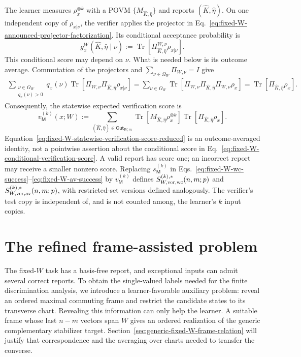 \documentclass[11pt]{article}
\newcommand{\Tr}{\operatorname{Tr}}
\newcommand{\1}{\mathbf 1}
\theoremstyle{plain}
\theoremstyle{definition}
\theoremstyle{remark}
\begin{document}
The learner measures $\rho_x^{\otimes k}$ with a POVM
$\{M_{\widehat K,\widehat\eta}\}$ and reports
$(\widehat K,\widehat\eta)$.  On one independent copy of
$\rho_{x|\nu}$, the verifier applies the projector in
Eq.~\eqref{eq:fixed-W-announced-projector-factorization}.  Its conditional
acceptance probability is
\begin{equation}
 g_x^W(\widehat K,\widehat\eta\mid\nu)
 :=\Tr[\Pi_{\widehat K,\widehat\eta}^{W,\nu}\rho_{x|\nu}].
 \label{eq:fixed-W-conditional-verification-score}
\end{equation}
This conditional score may depend on $\nu$.  What is needed below is its
outcome average.  Commutation of the projectors and
$\sum_{\nu\in\Omega_W}\Pi_{W,\nu}=I$ give
\begin{align}
 \sum_{\substack{\nu\in\Omega_W\\q_x(\nu)>0}}
 q_x(\nu)
 \Tr\!\left[
   \Pi_{W,\nu}\Pi_{\widehat K,\widehat\eta}
   \rho_{x|\nu}
 \right]
 =
 \sum_{\nu\in\Omega_W}
 \Tr\!\left[
   \Pi_{W,\nu}\Pi_{\widehat K,\widehat\eta}
   \Pi_{W,\nu}\rho_x
 \right]
 =\Tr[\Pi_{\widehat K,\widehat\eta}\rho_x].
 \label{eq:fixed-W-outcome-averaged-score}
\end{align}
Consequently, the statewise expected verification score is
\begin{equation}
 v_{\mathsf M}^{(k)}(x;W)
 :=\sum_{(\widehat K,\widehat\eta)\in\mathsf{Out}_{W,m}}
 \Tr[M_{\widehat K,\widehat\eta}\rho_x^{\otimes k}]
 \Tr[\Pi_{\widehat K,\widehat\eta}\rho_x].
 \label{eq:fixed-W-statewise-verification-score-reduced}
\end{equation}
Equation~\eqref{eq:fixed-W-statewise-verification-score-reduced} is an
outcome-averaged identity, not a pointwise assertion about the conditional
score in Eq.~\eqref{eq:fixed-W-conditional-verification-score}.  A valid report
has score one; an incorrect report may receive a smaller nonzero score.
Replacing $s_{\mathsf M}^{(k)}$ in
Eqs.~\eqref{eq:fixed-W-wc-success}--\eqref{eq:fixed-W-av-success} by
$v_{\mathsf M}^{(k)}$ defines
$S_{W,\rm ver,wc}^{(k),*}(n,m;p)$ and
$S_{W,\rm ver,av}^{(k),*}(n,m;p)$, with restricted-set versions defined
analogously.  The verifier's test copy is independent of, and is not counted
among, the learner's $k$ input copies.

\section{The refined frame-assisted problem}
\label{sec:model-main-results}
The fixed-$W$ task has a basis-free report, and exceptional inputs can admit
several correct reports.  To obtain the single-valued labels needed for the
finite discrimination analysis, we introduce a learner-favorable auxiliary
problem: reveal an ordered maximal commuting frame and restrict the candidate
states to its transverse chart.  Revealing this information can only help the
learner.  A suitable frame whose last $n-m$ vectors span $W$ gives an ordered
realization of the generic complementary stabilizer target.
Section~\ref{sec:generic-fixed-W-frame-relation}
will justify that correspondence and the averaging over charts needed to
transfer the converse.
\end{document}
